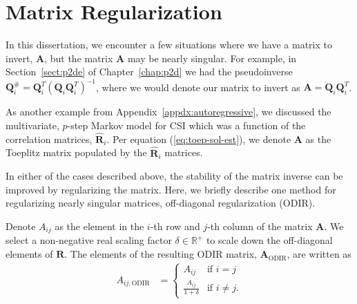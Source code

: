 \chapter{Matrix Regularization}
\label{appdx:odir}

In this dissertation, we encounter a few situations where we have a matrix to invert, $\mathbf{A}$, but the matrix $\mathbf{A}$ may be nearly singular. For example, in Section~\ref{sect:p2de} of Chapter~\ref{chap:p2d} we had the pseudoinverse $\mathbf{Q}_i^{\#} = \mathbf{Q}_i^T\left(\mathbf{Q}_i\mathbf{Q}_i^T\right)^{-1}$, where we would denote our matrix to invert as $\mathbf{A}=\mathbf{Q}_i\mathbf{Q}_i^T$.

As another example from Appendix~\ref{appdx:autoregressive}, we discussed the multivariate, $p$-step Markov model for CSI which was a function of the correlation matrices, $\hat{\mathbf{R}}_i$. Per equation (\ref{eq:toep-sol-est}), we denote $\mathbf{A}$ as the Toeplitz matrix populated by the $\hat{\mathbf{R}}_i$ matrices.

In either of the cases described above, the stability of the matrix inverse can be improved by regularizing the matrix. Here, we briefly describe one method for regularizing nearly singular matrices, off-diagonal regularization (ODIR).

Denote $A_{ij}$ as the element in the $i$-th row and $j$-th column of the matrix $\mathbf{A}$. We select a non-negative real scaling factor $\delta \in \mathbb{R}^{+}$ to scale down the off-diagonal elements of $\mathbf{R}$. The elements of the resulting ODIR matrix, $\mathbf{A}_{\text{ODIR}}$, are written as
\begin{align}
    A_{ij, \text{ODIR}} &= 
        \begin{cases}
            A_{ij} & \text{if } i = j\\
            \frac{A_{ij}}{1+\delta} & \text{if } i \neq j.
        \end{cases}
\end{align}
